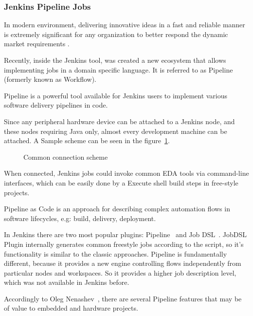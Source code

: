\subsubsection{Jenkins Pipeline Jobs}\label{jenkinsPipeline}

In modern environment, delivering innovative ideas in a fast and reliable manner is extremely significant for any organization to better respond the dynamic market requirements \cite{Soni2015}. 

Recently, inside the Jenkins tool, was created a new ecosystem that allows implementing jobs in a domain specific language. It is referred to as Pipeline~\citet{jnks:pipeline} (formerly known as Workflow).

Pipeline is a powerful tool available for Jenkins users to implement various software delivery pipelines in code.

Since any peripheral hardware device can be attached to a Jenkins node, and these nodes requiring Java only, almost every development machine can be attached. A Sample scheme can be seen in the  figure~\ref{fig:connectionScheme}.

  \begin{figure}[H]
  \centering
      \caption{Common connection scheme ~\cite{jnks:automatedPipeline}}
      \label{fig:connectionScheme}
  \end{figure}
  
When connected, Jenkins jobs could invoke common EDA tools via command-line interfaces, which can be easily done by a Execute shell build steps in free-style projects.

Pipeline as Code is an approach for describing complex automation flows in software lifecycles, e.g: build, delivery, deployment.

In Jenkins there are two most popular plugins: Pipeline~\citet{jnks:pipeline} and Job DSL~\cite{jnks:dsl}. JobDSL Plugin internally generates common freestyle jobs according to the script, so it’s functionality is similar to the classic approaches. Pipeline is fundamentally different, because it provides a new engine controlling flows independently from particular nodes and workspaces. So it provides a higher job description level, which was not available in Jenkins before.

Accordingly to Oleg Nenashev~\cite{jnks:automatedPipeline}, there are several Pipeline features that may be of value to embedded and hardware projects.

